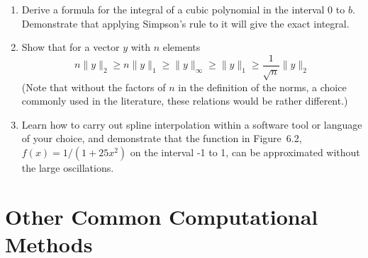 \documentclass{article}
\begin{document}
\begin{enumerate}
\item Derive a formula for the integral of a cubic polynomial in the interval 0 to $b$. Demonstrate that applying Simpson's rule to it will give the exact integral.

\item Show that for a vector $y$ with $n$ elements
\[
n \lVert y \rVert_2
\geq n \lVert y \rVert_1
\geq \lVert y \rVert_\infty
\geq \lVert y \rVert_1 
\geq \frac{1}{\sqrt n} \lVert y \rVert_2
\]
(Note that without the factors of $n$ in the definition of the norms, a choice commonly used in the literature, these relations would be rather different.)

\item Learn how to carry out spline interpolation within a software tool or language of your choice, and demonstrate that the function in Figure~6.2, $f(x)=1/(1+25x^2)$ on the interval -1 to 1, can be approximated without the large oscillations.

  
\end{enumerate}
 







\newpage
\section{Other Common Computational Methods}
\end{document}
